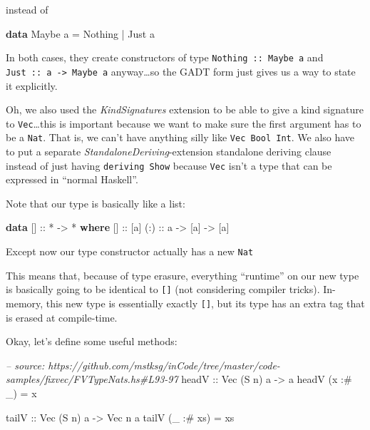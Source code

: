 \documentclass[]{article}
\newenvironment{Shaded}{}{}
\newcommand{\KeywordTok}[1]{\textcolor[rgb]{0.00,0.44,0.13}{\textbf{{#1}}}}
\newcommand{\DataTypeTok}[1]{\textcolor[rgb]{0.56,0.13,0.00}{{#1}}}
\newcommand{\CommentTok}[1]{\textcolor[rgb]{0.38,0.63,0.69}{\textit{{#1}}}}
\newcommand{\OtherTok}[1]{\textcolor[rgb]{0.00,0.44,0.13}{{#1}}}
\newcommand{\FunctionTok}[1]{\textcolor[rgb]{0.02,0.16,0.49}{{#1}}}
\newcommand{\NormalTok}[1]{{#1}}
\begin{document}
instead of

\begin{Shaded}
\begin{Highlighting}[]
\KeywordTok{data} \DataTypeTok{Maybe} \NormalTok{a }\FunctionTok{=} \DataTypeTok{Nothing} \FunctionTok{|} \DataTypeTok{Just} \NormalTok{a}
\end{Highlighting}
\end{Shaded}

In both cases, they create constructors of type
\texttt{Nothing\ ::\ Maybe\ a} and
\texttt{Just\ ::\ a\ -\textgreater{}\ Maybe\ a} anyway\ldots{}so the
GADT form just gives us a way to state it explicitly.

Oh, we also used the \emph{KindSignatures} extension to be able to give
a kind signature to \texttt{Vec}\ldots{}this is important because we
want to make sure the first argument has to be a \texttt{Nat}. That is,
we can't have anything silly like \texttt{Vec\ Bool\ Int}. We also have
to put a separate \emph{StandaloneDeriving}-extension standalone
deriving clause instead of just having \texttt{deriving\ Show} because
\texttt{Vec} isn't a type that can be expressed in ``normal Haskell''.

Note that our type is basically like a list:

\begin{Shaded}
\begin{Highlighting}[]
\KeywordTok{data} \NormalTok{[]}\OtherTok{ ::} \FunctionTok{*} \OtherTok{->} \FunctionTok{*} \KeywordTok{where}
    \NormalTok{[]}\OtherTok{  ::} \NormalTok{[a]}
\OtherTok{    (:) ::} \NormalTok{a }\OtherTok{->} \NormalTok{[a] }\OtherTok{->} \NormalTok{[a]}
\end{Highlighting}
\end{Shaded}

Except now our type constructor actually has a new \texttt{Nat}

This means that, because of type erasure, everything ``runtime'' on our
new type is basically going to be identical to \texttt{{[}{]}} (not
considering compiler tricks). In-memory, this new type is essentially
exactly \texttt{{[}{]}}, but its type has an extra tag that is erased at
compile-time.

Okay, let's define some useful methods:

\begin{Shaded}
\begin{Highlighting}[]
\CommentTok{-- source: https://github.com/mstksg/inCode/tree/master/code-samples/fixvec/FVTypeNats.hs#L93-97}
\OtherTok{headV ::} \DataTypeTok{Vec} \NormalTok{(}\DataTypeTok{S} \NormalTok{n) a }\OtherTok{->} \NormalTok{a}
\NormalTok{headV (x }\FunctionTok{:#} \NormalTok{_)  }\FunctionTok{=} \NormalTok{x}

\OtherTok{tailV ::} \DataTypeTok{Vec} \NormalTok{(}\DataTypeTok{S} \NormalTok{n) a }\OtherTok{->} \DataTypeTok{Vec} \NormalTok{n a}
\NormalTok{tailV (_ }\FunctionTok{:#} \NormalTok{xs) }\FunctionTok{=} \NormalTok{xs}
\end{Highlighting}
\end{Shaded}
\end{document}
